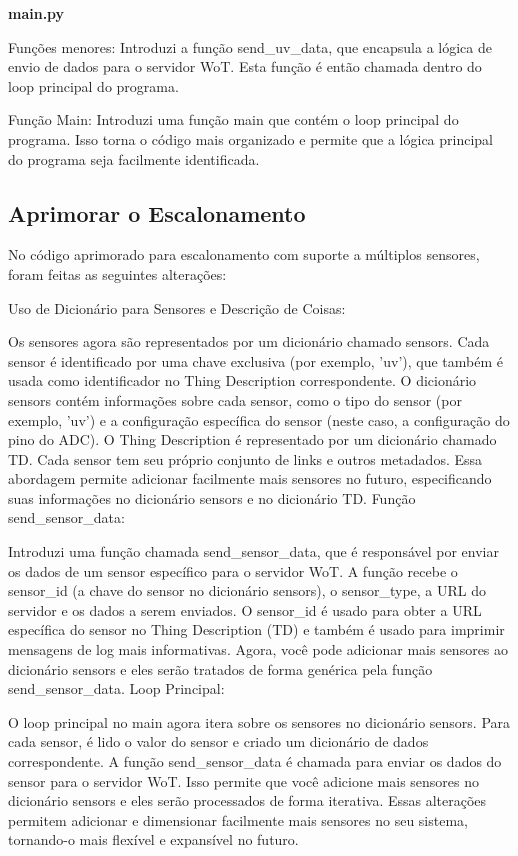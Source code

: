 \textbf{main.py}

Funções menores: Introduzi a função send\_uv\_data, que encapsula a lógica de envio de dados para o servidor WoT. Esta função é então chamada dentro do loop principal do programa.

Função Main: Introduzi uma função main que contém o loop principal do programa. Isso torna o código mais organizado e permite que a lógica principal do programa seja facilmente identificada.

\subsection{Aprimorar o Escalonamento}

No código aprimorado para escalonamento com suporte a múltiplos sensores, foram feitas as seguintes alterações:

Uso de Dicionário para Sensores e Descrição de Coisas:

Os sensores agora são representados por um dicionário chamado sensors. Cada sensor é identificado por uma chave exclusiva (por exemplo, 'uv'), que também é usada como identificador no Thing Description correspondente.
O dicionário sensors contém informações sobre cada sensor, como o tipo do sensor (por exemplo, 'uv') e a configuração específica do sensor (neste caso, a configuração do pino do ADC).
O Thing Description é representado por um dicionário chamado TD. Cada sensor tem seu próprio conjunto de links e outros metadados.
Essa abordagem permite adicionar facilmente mais sensores no futuro, especificando suas informações no dicionário sensors e no dicionário TD.
Função send\_sensor\_data:

Introduzi uma função chamada send\_sensor\_data, que é responsável por enviar os dados de um sensor específico para o servidor WoT.
A função recebe o sensor\_id (a chave do sensor no dicionário sensors), o sensor\_type, a URL do servidor e os dados a serem enviados.
O sensor\_id é usado para obter a URL específica do sensor no Thing Description (TD) e também é usado para imprimir mensagens de log mais informativas.
Agora, você pode adicionar mais sensores ao dicionário sensors e eles serão tratados de forma genérica pela função send\_sensor\_data.
Loop Principal:

O loop principal no main agora itera sobre os sensores no dicionário sensors.
Para cada sensor, é lido o valor do sensor e criado um dicionário de dados correspondente.
A função send\_sensor\_data é chamada para enviar os dados do sensor para o servidor WoT.
Isso permite que você adicione mais sensores no dicionário sensors e eles serão processados de forma iterativa.
Essas alterações permitem adicionar e dimensionar facilmente mais sensores no seu sistema, tornando-o mais flexível e expansível no futuro.

